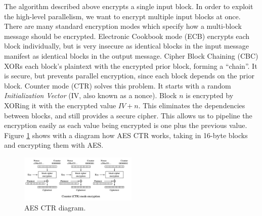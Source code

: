 The algorithm described above encrypts a single input block. In order to exploit the high-level parallelism, we want to encrypt multiple input blocks at once.
There are many standard encryption modes which specify how a multi-block message should be encrypted.
Electronic Cookbook mode (ECB) encrypts each block individually, but is very insecure as identical blocks in the input message manifest as identical blocks in the output message.
Cipher Block Chaining (CBC) XORs each block's plaintext with the encrypted prior block, forming a ``chain''. It is secure, but prevents parallel encryption, since each block depends on the prior block.
Counter mode (CTR) solves this problem. It starts with a random \emph{Initialization Vector} (IV, also known as a nonce). Block $n$ is encrypted by XORing it with the encrypted value $IV + n$.
This eliminates the dependencies between blocks, and still provides a secure cipher.
This allows us to pipeline the encryption easily as each value being encrypted is one plus the previous value.
Figure \ref{fig:aesctr} shows with a diagram how AES CTR works, taking in 16-byte blocks and encrypting them with AES.

\begin{figure}[h]
\centering
\includegraphics[width=0.5\textwidth]{aesctr}
\caption{AES CTR diagram.}
\label{fig:aesctr}
\end{figure}

